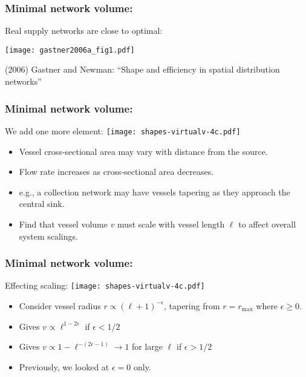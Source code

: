 \begin{frame}
  \frametitle{Minimal network volume:}

  Real supply networks are close to optimal:

  \texttt{[image: gastner2006a\_fig1.pdf]}

  \bigskip

  {\small (2006)
    Gastner and Newman\cite{gastner2006a}:
    ``Shape and efficiency in spatial distribution networks'' }

\end{frame}

\begin{frame}
  \frametitle{Minimal network volume:}

  \begin{block}{We add one more element:}
    \texttt{[image: shapes-virtualv-4c.pdf]}
    \begin{itemize}
    \item Vessel cross-sectional area
      may vary with distance from the source.
    \item
      Flow rate increases as cross-sectional area decreases.
    \item e.g., a collection network may
      have vessels tapering as they approach
      the central sink.
    \item
      Find that vessel volume $v$ must scale
      with vessel length $\ell$ to affect overall
      system scalings.
    \end{itemize}
  \end{block}
\end{frame}

\begin{frame}
  \frametitle{Minimal network volume:}

  \begin{block}{Effecting scaling:}
    \texttt{[image: shapes-virtualv-4c.pdf]}
    \begin{itemize}
    \item
      Consider vessel radius $r \propto (\ell+1)^{-\epsilon}$,
      tapering from $r=r_{\max}$ where $\epsilon \ge 0$.
    \item
      Gives
      $
      v \propto \ell^{1-2\epsilon}
      $ if $\epsilon < 1/2$
    \item
      Gives
      $
      v \propto 1 - \ell^{-(2\epsilon-1)} \rightarrow 1$ for large $\ell$
      if $\epsilon > 1/2$
    \item
      Previously, we looked at $\epsilon=0$ only.
    \end{itemize}
  \end{block}
\end{frame}

